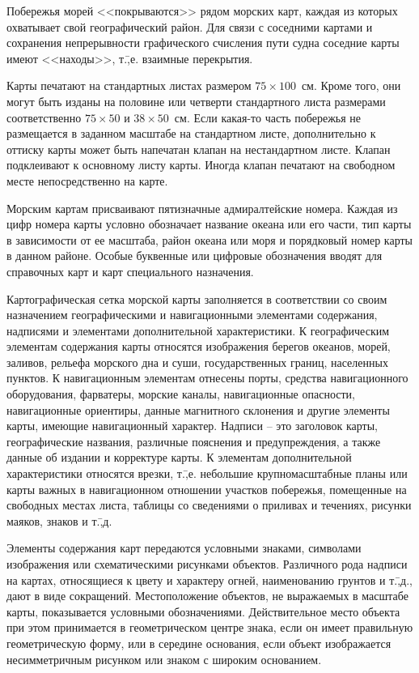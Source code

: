Побережья морей <<покрываются>> рядом морских карт, каждая из которых охватывает свой географический район. Для связи с соседними картами и сохранения непрерывности графического счисления пути судна соседние карты имеют <<находы>>, т.\=,е. взаимные перекрытия. 

Карты печатают на стандартных листах размером $75 \times 100$~см. Кроме того, они могут быть изданы на половине или четверти стандартного листа размерами соответственно $75 \times 50$ и $38 \times 50$~см. Если какая-то часть побережья не размещается в заданном масштабе на стандартном листе, дополнительно к оттиску карты может быть напечатан клапан на нестандартном листе. Клапан подклеивают к основному листу карты. Иногда клапан печатают на свободном месте непосредственно на карте. 

Морским картам присваивают пятизначные адмиралтейские номера. Каждая из цифр номера карты условно обозначает название океана или его части, тип карты в зависимости от ее масштаба, район океана или моря и порядковый номер карты в данном районе. Особые буквенные или цифровые обозначения вводят для справочных карт и карт специального назначения. 

Картографическая сетка морской карты заполняется в соответствии со своим назначением географическими и навигационными элементами содержания, надписями и элементами дополнительной характеристики. К географическим элементам содержания карты относятся изображения берегов океанов, морей, заливов, рельефа морского дна и суши, государственных границ, населенных пунктов. К навигационным элементам отнесены порты, средства навигационного оборудования, фарватеры, морские каналы, навигационные опасности, навигационные ориентиры, данные магнитного склонения и другие элементы карты, имеющие навигационный характер. Надписи \--- это заголовок карты, географические названия, различные пояснения и предупреждения, а также данные об издании и корректуре карты. К элементам дополнительной характеристики относятся врезки, т.\=,е. небольшие крупномасштабные планы или карты важных в навигационном отношении участков побережья, помещенные на свободных местах листа, таблицы со сведениями о приливах и течениях, рисунки маяков, знаков и т.\=,д.
 
Элементы содержания карт передаются условными знаками, символами изображения или схематическими рисунками объектов. Различного рода надписи на картах, относящиеся к цвету и характеру огней, наименованию грунтов и т.\=,д., дают в виде сокращений. Местоположение объектов, не выражаемых в масштабе карты, показывается условными обозначениями. Действительное место объекта при этом принимается в геометрическом центре знака, если он имеет правильную геометрическую форму, или в середине основания, если объект изображается несимметричным рисунком или знаком с широким основанием. 

